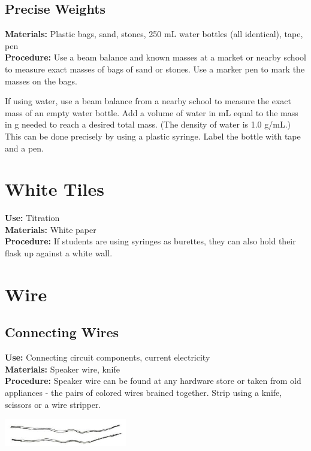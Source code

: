 \begin{multicols}{2}
\subsection{Precise Weights}
\vspace{-6pt}
\textbf{Materials:} Plastic bags, sand, stones, 250 mL water bottles (all identical), tape, pen\\
\textbf{Procedure:} 
Use a beam balance and known masses at a market or nearby school to measure exact masses of bags of sand or stones.  Use a marker pen to mark the masses on the bags. 

If using water, use a beam balance from a nearby school to measure the exact mass of an empty water bottle. Add a volume of water in mL equal to the mass in g needed to reach a desired total mass. (The density of water is 1.0 g/mL.) This can be done precisely by using a plastic syringe. Label the bottle with tape and a pen.

\section{White Tiles}
\label{sec:white-tiles}
\vspace{-10pt}
\textbf{Use:} Titration\\
\textbf{Materials:} White paper\\
\textbf{Procedure:} If students are using syringes as burettes, they can also hold their flask up against a white wall.

\section{Wire}
\label{sec:wire}

\subsection{Connecting Wires}
\vspace{-6pt}
\textbf{Use:} Connecting circuit components, current electricity\\
\textbf{Materials:} Speaker wire, knife\\
\textbf{Procedure:} Speaker wire can be found at any hardware store or taken from old appliances - the pairs of colored wires brained together. Strip using a knife, scissors or a wire stripper.
\begin{center}
\includegraphics[width=0.4\textwidth]{./img/source/wire.jpg}
\end{center}


\end{multicols}
